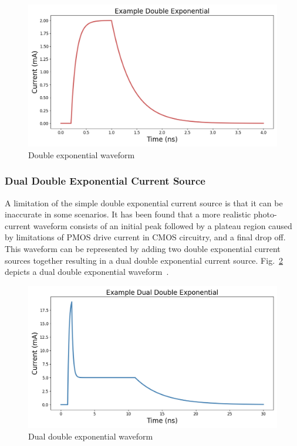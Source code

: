 \documentclass[conference]{IEEEtran}
\begin{document}
    \begin{figure}[htbp]
        \centering
        \includegraphics[width=0.95\linewidth]{EX_Double_Exponential}
        \caption{Double exponential waveform}
        \label{fig:double_exp}
    \end{figure}

    \subsubsection{Dual Double Exponential Current Source}
    A limitation of the simple double exponential current source is that it can be inaccurate in some scenarios.
    It has been found that a more realistic photo-current waveform consists of an initial peak followed by a plateau region caused by limitations of PMOS drive current in CMOS circuitry, and a final drop off.
    This waveform can be represented by adding two double exponential current sources together resulting in a dual double exponential current source.
    Fig.~\ref{fig:dual_double_exp} depicts a dual double exponential waveform~\cite{Black2015}.

    \begin{figure}[htbp]
        \centering
        \includegraphics[width=0.95\linewidth]{EX_Dual_Double_Exponential}
        \caption{Dual double exponential waveform}
        \label{fig:dual_double_exp}
    \end{figure}
\end{document}
